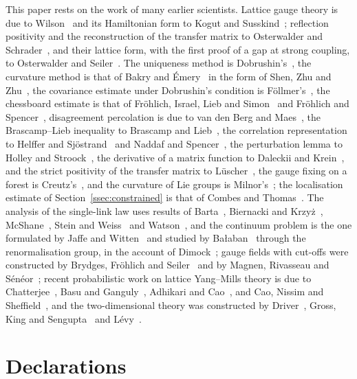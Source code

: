 \documentclass[11pt]{amsart}
\theoremstyle{definition}
\theoremstyle{remark}
\numberwithin{equation}{section}
\begin{document}
This paper rests on the work of many earlier scientists. Lattice gauge
theory is due to Wilson~\cite{Wil74} and its Hamiltonian form to Kogut and
Susskind~\cite{KS75}; reflection positivity and the reconstruction of the
transfer matrix to Osterwalder and Schrader~\cite{OS73,OS75}, and their
lattice form, with the first proof of a gap at strong coupling, to
Osterwalder and Seiler~\cite{OSei78,Sei82}. The uniqueness method is
Dobrushin's~\cite{Dob68,Dob70,DS85}, the curvature method is that of Bakry
and \'Emery~\cite{BE85,BGL14} in the form of Shen, Zhu and Zhu~\cite{SZZ23},
the covariance estimate under Dobrushin's condition is F\"ollmer's~\cite{Fol82},
the chessboard estimate is that of Fr\"ohlich, Israel, Lieb and
Simon~\cite{FILS78} and Fr\"ohlich and Spencer~\cite{FS82}, disagreement
percolation is due to van den Berg and Maes~\cite{vdBM94}, the
Brascamp--Lieb inequality to Brascamp and Lieb~\cite{BL76}, the
correlation representation to Helffer and Sj\"ostrand~\cite{HS94} and
Naddaf and Spencer~\cite{NS97}, the perturbation lemma to Holley and
Stroock~\cite{HS87}, the derivative of a matrix function to Daleckii and
Krein~\cite{DK65}, and the strict positivity of the transfer matrix to
L\"uscher~\cite{Lus77},
the gauge fixing on a forest is Creutz's~\cite{Cre77}, and the curvature of
Lie groups is Milnor's~\cite{Mil76}; the localisation estimate of
Section~\ref{ssec:constrained} is that of Combes and Thomas~\cite{CT73}. The analysis of the single-link law
uses results of Barta~\cite{Bar37}, Biernacki and Krzy\.z~\cite{BK55},
McShane~\cite{McS34}, Stein and Weiss~\cite{SW71} and Watson~\cite{Wat44}, and
the continuum problem is the one formulated by Jaffe and Witten~\cite{JW06}
and studied by Ba{\l}aban~\cite{Bal84a,Bal85a,Bal89b} through the
renormalisation group, in the account of Dimock~\cite{Dim13}; gauge fields
with cut-offs were constructed by Brydges, Fr\"ohlich and
Seiler~\cite{BFS79} and by Magnen, Rivasseau and S\'en\'eor~\cite{MRS93};
recent probabilistic work on lattice Yang--Mills
theory is due to Chatterjee~\cite{Chat19,Chat19b}, Basu and
Ganguly~\cite{BG18}, Adhikari and Cao~\cite{AC25}, and Cao, Nissim and
Sheffield~\cite{CNS25}, and the two-dimensional theory was constructed by
Driver~\cite{Dri89}, Gross, King and Sengupta~\cite{GKS89} and
L\'evy~\cite{Lev03}.

\section*{Declarations}
\end{document}
